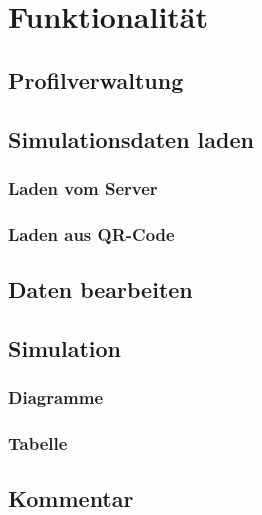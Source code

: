 \chapter{Funktionalität}
\label{chap:funk}

	\section{Profilverwaltung}
	\label{sec:profile}
	
	\section{Simulationsdaten laden}
	\label{sec:load-sim-data}
	
		\subsection{Laden vom Server}
		\label{subsec:load-srv}
		
		\subsection{Laden aus QR-Code}
		\label{subsec:load-qr}
		
	\section{Daten bearbeiten}
	\label{sec:edit-data}
	
	\section{Simulation}
	\label{sec:sim}
	
		\subsection{Diagramme}
		\label{subsec:diagr}
		
		\subsection{Tabelle}
		\label{subsec:table}
		
	\section{Kommentar}
	\label{sec:comment}
	
		